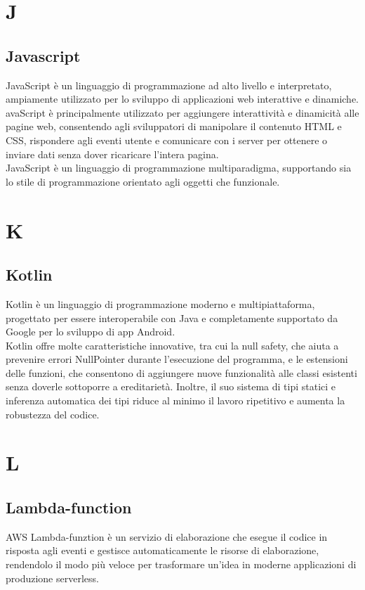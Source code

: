 \documentclass{article}
\begin{document}
\section{J}
\subsection{Javascript}
JavaScript è un linguaggio di programmazione ad alto livello e interpretato, ampiamente utilizzato per lo sviluppo di applicazioni web interattive e dinamiche.\\
avaScript è principalmente utilizzato per aggiungere interattività e dinamicità alle pagine web, consentendo agli sviluppatori di manipolare il contenuto HTML e CSS, rispondere agli eventi utente e comunicare con i server per ottenere o inviare dati senza dover ricaricare l'intera pagina.\\
JavaScript è un linguaggio di programmazione multiparadigma, supportando sia lo stile di programmazione orientato agli oggetti che funzionale.

\section{K}
\subsection{Kotlin}
Kotlin è un linguaggio di programmazione moderno e multipiattaforma, progettato per essere interoperabile con Java e completamente supportato da Google per lo sviluppo di app Android.\\
Kotlin offre molte caratteristiche innovative, tra cui la null safety, che aiuta a prevenire errori NullPointer durante l'esecuzione del programma, e le estensioni delle funzioni, che consentono di aggiungere nuove funzionalità alle classi esistenti senza doverle sottoporre a ereditarietà. Inoltre, il suo sistema di tipi statici e inferenza automatica dei tipi riduce al minimo il lavoro ripetitivo e aumenta la robustezza del codice.

\section{L}
\subsection{Lambda-function}
AWS Lambda-funztion è un servizio di elaborazione che esegue il codice in risposta agli eventi e gestisce automaticamente le risorse di elaborazione, rendendolo il modo più veloce per trasformare un'idea in moderne applicazioni di produzione serverless. 
\end{document}
